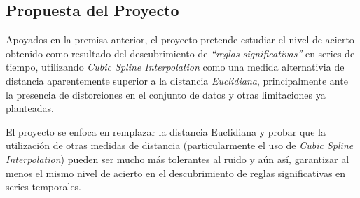 \subsection{Propuesta del Proyecto}
Apoyados en la premisa anterior, el proyecto pretende estudiar el nivel de acierto obtenido como resultado del descubrimiento de \textit{\enquote{reglas significativas}} en series de tiempo, utilizando \textit{Cubic Spline Interpolation} como una medida alternativia de distancia aparentemente superior a la distancia \textit{Euclidiana}, principalmente ante la presen\-cia de distorciones en el conjunto de datos y otras limitaciones ya planteadas.\par
El proyecto se enfoca en remplazar la distancia Euclidiana y probar que la utilizaci\'on de otras medidas de distancia (particularmente el uso de \textit{Cubic Spline Interpolation}) pueden ser mucho m\'as tolerantes al ruido y a\'un as\'i, garantizar al menos el mismo nivel de acierto en el descubrimiento de reglas significativas en series temporales.

